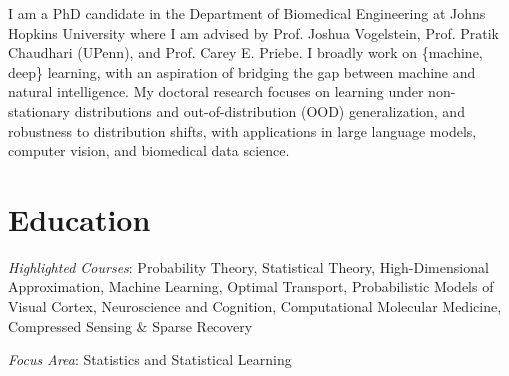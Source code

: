 \documentclass[10pt,a4paper,sans]{moderncv} %
\begin{document}
\makecvtitle %
I am a PhD candidate in the Department of Biomedical Engineering at Johns Hopkins University 
where I am advised by Prof. Joshua Vogelstein, Prof. Pratik Chaudhari (UPenn), and Prof. Carey E. Priebe. 
I broadly work on \{machine, deep\} learning, with an aspiration of bridging the gap between 
machine and natural intelligence. My doctoral research focuses on learning under non-stationary 
distributions and out-of-distribution (OOD) generalization, and robustness to distribution shifts, with
applications in large language models, computer vision, 
and biomedical data science.


\section{Education}
{\textit{Highlighted Courses}: Probability Theory, Statistical Theory, High-Dimensional Approximation, Machine Learning, Optimal Transport, Probabilistic Models of Visual Cortex, Neuroscience and Cognition, Computational Molecular Medicine, Compressed Sensing \& Sparse Recovery}

{\textit{Focus Area}: Statistics and Statistical Learning}


\let\thefootnote\relax{}

\end{document}
